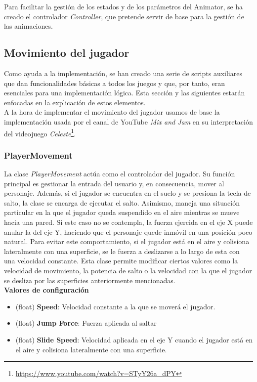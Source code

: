 Para facilitar la gestión de los estados y de los parámetros del Animator, se ha creado el controlador \textit{Controller}, que pretende servir de base para la gestión de las animaciones.

\subsection{Movimiento del jugador}

Como ayuda a la implementación, se han creado una serie de scripts auxiliares que dan funcionalidades básicas a todos los juegos y que, por tanto, eran esenciales para una implementación lógica. Esta sección y las siguientes estarán enfocadas en la explicación de estos elementos.\\
A la hora de implementar el movimiento del jugador usamos de base la implementación usada por el canal de YouTube \textit{Mix and Jam} en su interpretación del videojuego \textit{Celeste}\footnote{\url{https://www.youtube.com/watch?v=STyY26a_dPY}}.

\subsubsection{PlayerMovement}

La clase \textit{PlayerMovement} actúa como el controlador del jugador. Su función principal es gestionar la entrada del usuario y, en consecuencia, mover al personaje. Además, si el jugador se encuentra en el suelo y se presiona la tecla de salto, la clase se encarga de ejecutar el salto.
Asimismo, maneja una situación particular en la que el jugador queda suspendido en el aire mientras se mueve hacia una pared. Si este caso no se contempla, la fuerza ejercida en el eje X puede anular la del eje Y, haciendo que el personaje quede inmóvil en una posición poco natural. Para evitar este comportamiento, si el jugador está en el aire y colisiona lateralmente con una superficie, se le fuerza a deslizarse a lo largo de esta con una velocidad constante.
Esta clase permite modificar ciertos valores como la velocidad de movimiento, la potencia de salto o la velocidad con la que el jugador se desliza por las superficies anteriormente mencionadas.\\

\textbf{Valores de configuración}
\begin{itemize}
	\item (float) \textbf{Speed}: Velocidad constante a la que se moverá el jugador.
	\item (float) \textbf{Jump Force}: Fuerza aplicada al saltar
	\item (float) \textbf{Slide Speed}: Velocidad aplicada en el eje Y cuando el jugador está en el aire y colisiona lateralmente con una superficie.
\end{itemize}

